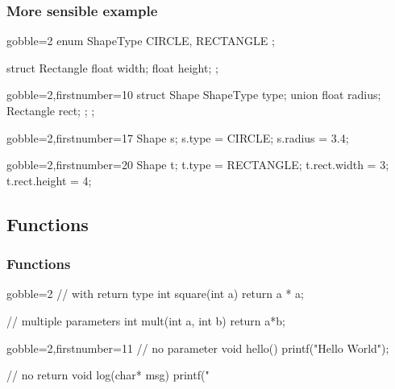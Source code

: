 \begin{frame}[fragile]
  \frametitle{More sensible example}
  \begin{multicols}{2}
    \begin{cppcode*}{gobble=2}
      enum ShapeType {
        CIRCLE,
        RECTANGLE
      };
      
      struct Rectangle {
        float width;
        float height;
      };
    \end{cppcode*}
    \columnbreak
    \pause
    \begin{cppcode*}{gobble=2,firstnumber=10}
      struct Shape {
        ShapeType type;
        union { 
          float radius;
          Rectangle rect;
        };
      };
    \end{cppcode*}
  \end{multicols}
  \pause
  \begin{multicols}{2}
    \begin{cppcode*}{gobble=2,firstnumber=17}
      Shape s;
      s.type = CIRCLE;
      s.radius = 3.4;
      
    \end{cppcode*}
    \columnbreak
    \begin{cppcode*}{gobble=2,firstnumber=20}
      Shape t;
      t.type = RECTANGLE;
      t.rect.width = 3;
      t.rect.height = 4;
    \end{cppcode*}
  \end{multicols}
\end{frame}

\subsection[$f()$]{Functions}

\begin{frame}[fragile]
  \frametitle{Functions}
  \begin{multicols}{2}
    \begin{cppcode*}{gobble=2}
      // with return type
      int square(int a) {
        return a * a;
      }

      // multiple parameters
      int mult(int a,
               int b) {
        return a*b;
      }
    \end{cppcode*}
    \columnbreak
    \begin{cppcode*}{gobble=2,firstnumber=11}
      // no parameter
      void hello() {
        printf("Hello World");
      }

      // no return
      void log(char* msg) {
        printf("%
      }
    \end{cppcode*}
  \end{multicols}
\end{frame}

